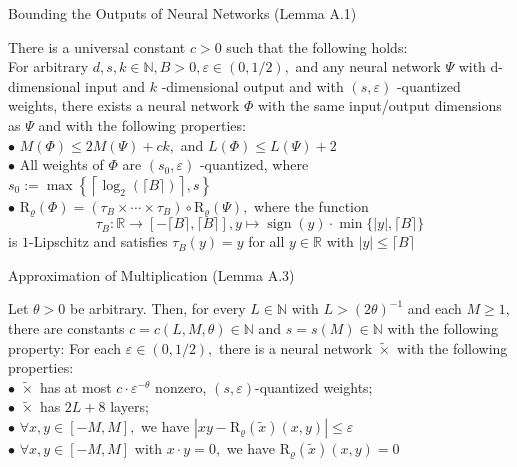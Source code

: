\documentclass{if-beamer}
\begin{document}
\begin{frame}{Bounding the Outputs of Neural Networks (Lemma A.1)}
    \begin{tcolorbox}
        There is a universal constant $c>0$ such that the following holds:\\
        For arbitrary $d, s, k \in \mathbb{N}, B>0, \varepsilon \in(0,1 / 2),$ and any neural network $\Psi$ with d-dimensional input and
        $k$ -dimensional output and with $(s, \varepsilon)$ -quantized weights, there exists a neural network $\Phi$ with the same input/output dimensions as $\Psi$ and with the following properties:\\
        {\small
        $\bullet$ $M(\Phi) \leq 2 M(\Psi)+c k,$ and $L(\Phi) \leq L(\Psi)+2$\\
        $\bullet$ All weights of $\Phi$ are $\left(s_{0}, \varepsilon\right)$ -quantized, where $s_{0}:=\max \left\{\left\lceil\log _{2}(\lceil B\rceil)\right\rceil, s\right\}$\\
        $\bullet$ $\mathrm{R}_{\varrho}(\Phi)=\left(\tau_{B} \times \cdots \times \tau_{B}\right) \circ \mathrm{R}_{\varrho}(\Psi),$ where the function
        \[
        \tau_{B}: \mathbb{R} \rightarrow[-\lceil B\rceil,\lceil B\rceil], y \mapsto \operatorname{sign}(y) \cdot \min \{|y|,\lceil B\rceil\}
        \]
        is $1$-Lipschitz and satisfies $\tau_{B}(y)=y$ for all $y \in \mathbb{R}$ with $|y| \leq\lceil B\rceil$
        }%
    \end{tcolorbox}
\end{frame}

\begin{frame}{Approximation of Multiplication (Lemma A.3)}
    \begin{tcolorbox}
        Let $\theta>0$ be arbitrary. Then, for every $L \in \mathbb{N}$ with $L>(2 \theta)^{-1}$ and each $M \geq 1$, there are constants $c=c(L, M, \theta) \in \mathbb{N}$ and $s=s(M) \in \mathbb{N}$ with the following property: For each $\varepsilon \in(0,1 / 2),$ there is a neural network $\widetilde{\times}$ with the following properties:\\
        $\bullet$ $\widetilde{\times}$ has at most $c \cdot \varepsilon^{-\theta}$ nonzero, $(s, \varepsilon)$-quantized weights;\\
        $\bullet$ $\widetilde{\times}$ has $2L+8$ layers;\\
        $\bullet$ $\forall x, y \in[-M, M],$ we have $\left|xy-\mathrm{R}_{\varrho}(\widetilde{x})(x, y)\right| \leq \varepsilon$\\
        $\bullet$  $\forall x, y \in[-M, M]$ with $x \cdot y=0,$ we have $\mathrm{R}_{\varrho}(\widetilde{x})(x, y)=0$
    \end{tcolorbox}
\end{frame}
\end{document}
